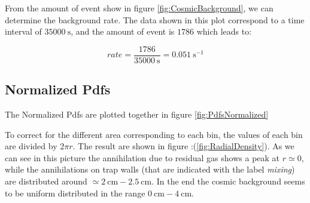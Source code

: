 \documentclass[11pt,a4paper,oneside]{article}
\begin{document}
From the amount of event show in figure \ref{fig:CosmicBackground}, we can determine the background rate. The data shown in this plot correspond to a time interval of $\SI{35000}{\second}$, and the amount of event is $1786$ which leads to:

\begin{equation} \label{eq:Rate}
rate = \frac{1786}{\SI{35000}{\second}} = \SI{0.051}{\second \tothe{-1}}
\end{equation}

\subsection{Normalized Pdfs}

The Normalized Pdfs are plotted together in figure \ref{fig:PdfsNormalized}
\begin{figure}[!hbtp]
\centering
{}
\end{figure}

To correct for the different area corresponding to each bin, the values of each bin are divided by $ 2 \pi r$. The result are shown in figure :(\ref{fig:RadialDensity}). As we can see in this picture the annihilation due to residual gas shows a peak at $r \simeq 0$, while the annihilations on trap walls (that are indicated with the label \textit{mixing}) are distributed around $\simeq \SI{2}{ \centi \meter} - \SI{2.5}{\centi \meter}$. In the end the cosmic background seems to be uniform distributed in the range $\SI{0}{\centi \meter} - \SI{4}{\centi \meter}$.
\end{document}
